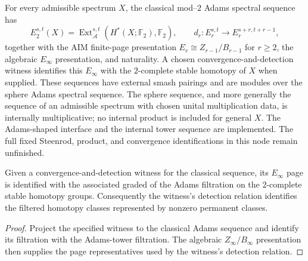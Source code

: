 \begin{definition}
  \label{def:classical-adams-ss}
  \notready
  For every admissible spectrum $X$, the classical mod--$2$ Adams spectral
  sequence has
  \[
    E_2^{s,t}(X)=\operatorname{Ext}_{\mathcal A}^{s,t}
      (H^*(X;\mathbb F_2),\mathbb F_2),
    \qquad d_r:E_r^{s,t}\to E_r^{s+r,t+r-1},
  \]
  together with the AIM finite-page presentation
  $E_r\cong Z_{r-1}/B_{r-1}$ for $r\ge2$, the algebraic $E_\infty$
  presentation, and naturality.  A chosen convergence-and-detection witness
  identifies this $E_\infty$ with the $2$-complete stable homotopy of $X$ when
  supplied.  These sequences
  have external smash pairings and are modules over the sphere Adams spectral
  sequence.  The sphere sequence, and more generally the sequence of an
  admissible spectrum with chosen unital multiplication data, is internally
  multiplicative; no internal product is included for general $X$.
  The Adams-shaped interface and the internal tower sequence are
  implemented. The full fixed Steenrod, product, and convergence
  identifications in this node remain unfinished.
\end{definition}

\begin{proposition}
  \label{prop:classical-adams-convergence}
  \notready
  Given a convergence-and-detection witness for the classical sequence, its
  $E_\infty$ page is identified with the associated graded of the Adams
  filtration on the $2$-complete stable homotopy groups.  Consequently the
  witness's detection relation identifies the filtered homotopy classes
  represented by nonzero permanent classes.
\end{proposition}

\begin{proof}
  Project the specified witness to the classical Adams sequence and identify
  its filtration with the Adams-tower filtration.  The algebraic
  $Z_\infty/B_\infty$ presentation then supplies the page representatives used
  by the witness's detection relation.
\end{proof}

